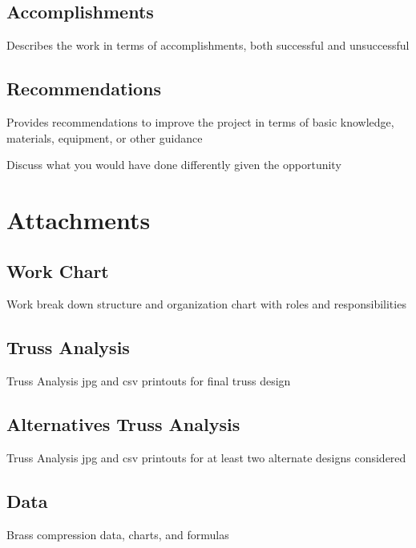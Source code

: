 \documentclass{article}
\let\Oldsection\section
\renewcommand{\section}{\FloatBarrier\Oldsection}
\let\Oldsubsection\subsection
\renewcommand{\subsection}{\FloatBarrier\Oldsubsection}
\begin{document}
  \subsection{Accomplishments}

  Describes the work in terms of accomplishments, both successful and unsuccessful

  \subsection{Recommendations}

  Provides recommendations to improve the project in terms of basic knowledge, materials, equipment, or other guidance

  Discuss what you would have done differently given the opportunity

  \newpage

  \section{Attachments}

  \subsection{Work Chart}

  Work break down structure and organization chart with roles and responsibilities

  \newpage

  \subsection{Truss Analysis}

  Truss Analysis jpg and csv printouts for final truss design

  \newpage

  \subsection{Alternatives Truss Analysis}

  Truss Analysis jpg and csv printouts for at least two alternate designs considered

  \newpage

  \subsection{Data}

  Brass compression data, charts, and formulas

  \newpage

  \printbibliography

  
\end{document}
